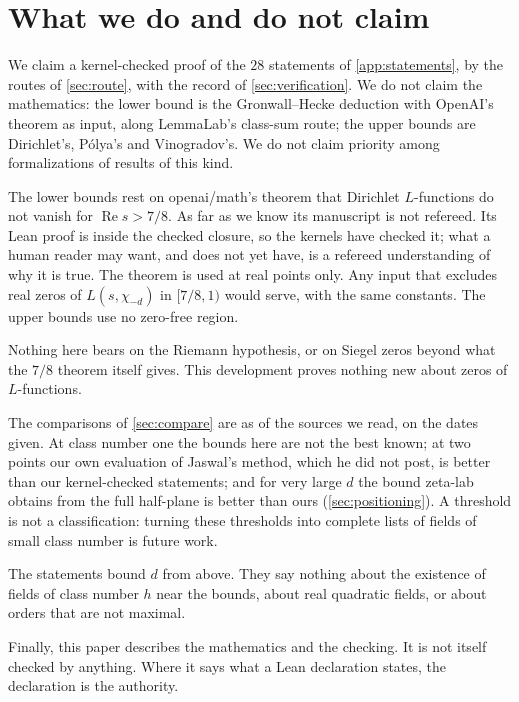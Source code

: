 \documentclass[11pt]{article}
\theoremstyle{definition}
\newcommand{\re}{\operatorname{Re}}
\begin{document}
\section{What we do and do not claim}\label{sec:notclaimed}

We claim a kernel-checked proof of the $28$ statements of \cref{app:statements}, by the routes of \cref{sec:route}, with the record of \cref{sec:verification}. We do not claim the mathematics: the lower bound is the Gronwall--Hecke deduction \cite{Landau1918} with OpenAI's theorem \cite{OAIqrh} as input, along LemmaLab's class-sum route; the upper bounds are Dirichlet's, Pólya's and Vinogradov's. We do not claim priority among formalizations of results of this kind.

The lower bounds rest on openai/math's theorem that Dirichlet $L$-functions do not vanish for $\re s > 7/8$. As far as we know its manuscript is not refereed. Its Lean proof is inside the checked closure, so the kernels have checked it; what a human reader may want, and does not yet have, is a refereed understanding of why it is true. The theorem is used at real points only. Any input that excludes real zeros of $L(s,\chi_{-d})$ in $[7/8, 1)$ would serve, with the same constants. The upper bounds use no zero-free region.

Nothing here bears on the Riemann hypothesis, or on Siegel zeros beyond what the $7/8$ theorem itself gives. This development proves nothing new about zeros of $L$-functions.

The comparisons of \cref{sec:compare} are as of the sources we read, on the dates given. At class number one the bounds here are not the best known; at two points our own evaluation of Jaswal's method, which he did not post, is better than our kernel-checked statements; and for very large $d$ the bound zeta-lab obtains from the full half-plane is better than ours (\cref{sec:positioning}). A threshold is not a classification: turning these thresholds into complete lists of fields of small class number is future work.

The statements bound $d$ from above. They say nothing about the existence of fields of class number $h$ near the bounds, about real quadratic fields, or about orders that are not maximal.

Finally, this paper describes the mathematics and the checking. It is not itself checked by anything. Where it says what a Lean declaration states, the declaration is the authority.
\end{document}

